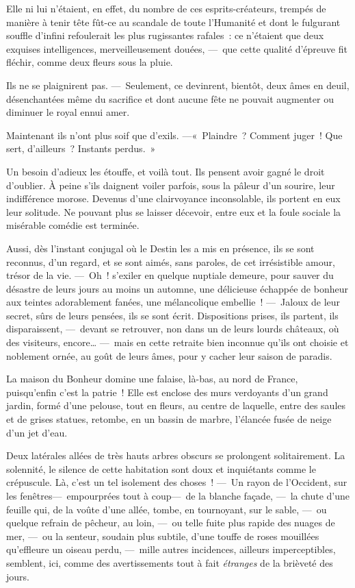 \documentclass[french,twoside]{book} %
\begin{document}
Elle ni lui n’étaient, en effet, du nombre de ces esprits-créateurs, trempés de manière à tenir tête fût-ce au scandale de toute l’Humanité et dont le fulgurant souffle d’infini refoulerait les plus rugissantes rafales : ce n’étaient que deux exquises intelligences, merveilleusement douées, — que cette qualité d’épreuve fit fléchir, comme deux fleurs sous la pluie.\par
Ils ne se plaignirent pas. — Seulement, ce devinrent, bientôt, deux âmes en deuil, désenchantées même du sacrifice et dont aucune   fête ne pouvait augmenter ou diminuer le royal ennui amer.\par
Maintenant ils n’ont plus soif que d’exils. —« Plaindre ? Comment juger ! Que sert, d’ailleurs ? Instants perdus. »\par
Un besoin d’adieux les étouffe, et voilà tout. Ils pensent avoir gagné le droit d’oublier. À peine s’ils daignent voiler parfois, sous la pâleur d’un sourire, leur indifférence morose. Devenus d’une clairvoyance inconsolable, ils portent en eux leur solitude. Ne pouvant plus se laisser décevoir, entre eux et la foule sociale la misérable comédie est terminée.\par
Aussi, dès l’instant conjugal où le Destin les a mis en présence, ils se sont reconnus, d’un regard, et se sont aimés, sans paroles, de cet irrésistible amour, trésor de la vie. — Oh ! s’exiler en quelque nuptiale demeure, pour sauver du désastre de leurs jours au moins un automne, une délicieuse échappée de bonheur aux teintes adorablement fanées, une mélancolique embellie ! — Jaloux de leur secret, sûrs de leurs pensées, ils se sont écrit. Dispositions prises,   ils partent, ils disparaissent, — devant se retrouver, non dans un de leurs lourds châteaux, où des visiteurs, encore… — mais en cette retraite bien inconnue qu’ils ont choisie et noblement ornée, au goût de leurs âmes, pour y cacher leur saison de paradis.\par
La maison du Bonheur domine une falaise, là-bas, au nord de France, puisqu’enfin c’est la patrie ! Elle est enclose des murs verdoyants d’un grand jardin, formé d’une pelouse, tout en fleurs, au centre de laquelle, entre des saules et de grises statues, retombe, en un bassin de marbre, l’élancée fusée de neige d’un jet d’eau.\par
Deux latérales allées de très hauts arbres obscurs se prolongent solitairement. La solennité, le silence de cette habitation sont doux et inquiétants comme le crépuscule. Là, c’est un tel isolement des choses ! — Un rayon de l’Occident, sur les fenêtres— empourprées tout à coup— de la blanche façade, — la chute d’une feuille qui, de la voûte d’une allée, tombe, en tournoyant, sur le sable, — ou quelque refrain de pêcheur, au loin, — ou telle fuite plus rapide   des nuages de mer, — ou la senteur, soudain plus subtile, d’une touffe de roses mouillées qu’effleure un oiseau perdu, — mille autres incidences, ailleurs imperceptibles, semblent, ici, comme des avertissements tout à fait \emph{étranges} de la brièveté des jours.\par
\end{document}
